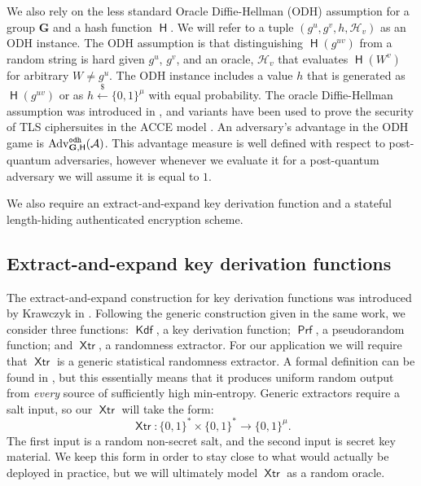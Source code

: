 \documentclass[USenglish,oneside,twocolumn]{article}
\theoremstyle{dgthm}
\theoremstyle{dgdef}
\newcommand{\Protocol}[1]{\operatorname{\mathsf{#1}}}
\newcommand{\samples}{\xleftarrow{\$}}
\newcommand{\AlgorithmName}[1]{\operatorname{\mathsf{#1}}}
\newcommand{\Hash}{\AlgorithmName{H}}
\newcommand{\KDF}{\AlgorithmName{Kdf}}
\newcommand{\PRF}{\AlgorithmName{Prf}}
\newcommand{\XTR}{\AlgorithmName{Xtr}}
\newcommand{\Experiment}[1]{\operatorname{\tt{#1}}}
\newcommand{\Algorithm}[1]{\mathcal #1}
\newcommand{\AdvName}[2]{\operatorname{\mathrm{Adv}_{\Protocol{#1}}^{\Experiment{#2}}}}
\newcommand{\Adv}[3]{\AdvName{#1}{#2}(\Algorithm{#3})}
\newcommand{\AdvOdh}[1]{\Adv{\mathbf{G}, \Hash}{odh}{#1}}
\begin{document}
  We also rely on the less standard Oracle Diffie-Hellman (ODH) assumption for
  a group $\mathbf{G}$ and a hash function $\Hash$. We will refer to a tuple
  $(g^u, g^v, h, \mathcal{H}_v)$ as an ODH instance. The ODH assumption is that
  distinguishing $\Hash(g^{uv})$ from a random string is hard given $g^u$,
  $g^v$, and an oracle, $\mathcal{H}_v$ that evaluates $\Hash(W^v)$ for
  arbitrary $W \ne g^u$. The ODH instance includes a value $h$ that is
  generated as $\Hash(g^{uv})$ or as $h \samples \{0,1\}^\mu$ with equal
  probability. The oracle Diffie-Hellman assumption was introduced in
  \cite{Abdalla2001}, and variants have been used to prove the security of TLS
  ciphersuites in the ACCE model \cite{Jager2012, Krawczyk2013}. An adversary's
  advantage in the ODH game is $\AdvOdh{A}$.  This advantage measure is well
  defined with respect to post-quantum adversaries, however whenever we
  evaluate it for a post-quantum adversary we will assume it is equal to $1$.


  We also require an extract-and-expand key derivation function and a stateful
  length-hiding authenticated encryption scheme.

  \subsection{Extract-and-expand key derivation functions}
    The extract-and-expand construction for key derivation functions was
    introduced by Krawczyk in \cite{Krawczyk2010}. Following the generic
    construction given in the same work, we consider three functions: $\KDF$, a
    key derivation function; $\PRF$, a pseudorandom function; and $\XTR$, a
    randomness extractor. For our application we will require that $\XTR$ is a
    generic statistical randomness extractor. A formal definition can be found
    in \cite{Krawczyk2010}, but this essentially means that it produces uniform
    random output from \emph{every} source of sufficiently high min-entropy.
    Generic extractors require a salt input, so our $\XTR$ will take the form:
    \[\XTR : \{0,1\}^* \times \{0,1\}^* \rightarrow \{0,1\}^\mu.\] The first
    input is a random non-secret salt, and the second input is secret key
    material. We keep this form in order to stay close to what would actually
    be deployed in practice, but we will ultimately model $\XTR$ as a random
    oracle.
\end{document}
